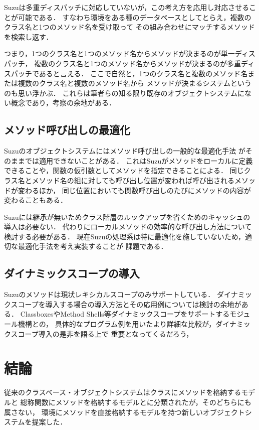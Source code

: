 \documentclass{ipsjprosym}
\begin{document}
Suzuは多重ディスパッチに対応していないが，この考え方を応用し対応させることが可能である．
すなわち環境をある種のデータベースとしてとらえ，複数のクラス名と1つのメソッド名を受け取って
その組み合わせにマッチするメソッドを検索し返す．

つまり，1つのクラス名と1つのメソッド名からメソッドが決まるのが単一ディスパッチ，
複数のクラス名と1つのメソッド名からメソッドが決まるのが多重ディスパッチであると言える．
ここで自然と，1つのクラス名と複数のメソッド名または複数のクラス名と複数のメソッド名から
メソッドが決まるシステムというのも思い浮かぶ．
これらは筆者らの知る限り既存のオブジェクトシステムにない概念であり，考察の余地がある．

\subsection{メソッド呼び出しの最適化}

Suzuのオブジェクトシステムにはメソッド呼び出しの一般的な最適化手法\cite{Onodera:1997-04-15}
がそのままでは適用できないことがある．
これはSuzuがメソッドをローカルに定義できることや，関数の仮引数としてメソッドを指定できることによる．
同じクラス名とメソッド名の組に対しても呼び出し位置が変われば呼び出されるメソッドが変わるほか，
同じ位置においても関数呼び出しのたびにメソッドの内容が変わることもある．

Suzuには継承が無いためクラス階層のルックアップを省くためのキャッシュの導入は必要ない．
代わりにローカルメソッドの効率的な呼び出し方法について検討する必要がある．
現在Suzuの処理系は特に最適化を施していないため，適切な最適化手法を考え実装することが
課題である．

\subsection{ダイナミックスコープの導入}

Suzuのメソッドは現状レキシカルスコープのみサポートしている．
ダイナミックスコープを導入する場合の導入方法とその応用例については検討の余地がある．
ClassboxesやMethod Shells等ダイナミックスコープをサポートするモジュール機構との，
具体的なプログラム例を用いたより詳細な比較が，ダイナミックスコープ導入の是非を語る上で
重要となってくるだろう，

\section{結論}

従来のクラスベース・オブジェクトシステムはクラスにメソッドを格納するモデルと
総称関数にメソッドを格納するモデルとに分類されたが，そのどちらにも属さない，
環境にメソッドを直接格納するモデルを持つ新しいオブジェクトシステムを提案した．
\end{document}
